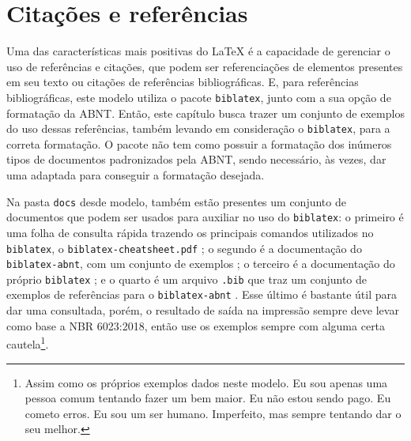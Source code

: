 \chapter{Citações e referências}
Uma das características mais positivas do \LaTeX{} é a capacidade de gerenciar o uso de referências e citações, que podem ser referenciações de elementos presentes em seu texto ou citações de referências bibliográficas. E, para referências bibliográficas\footnotemark, este modelo utiliza o pacote \verb|biblatex|, junto com a sua opção de formatação da ABNT. Então, este capítulo busca trazer um conjunto de exemplos do uso dessas referências, também levando em consideração o \verb|biblatex|, para a correta formatação. O pacote não tem como possuir a formatação dos inúmeros tipos de documentos padronizados pela ABNT, sendo necessário, às vezes, dar uma adaptada para conseguir a formatação desejada.

  Na pasta \texttt{docs} desde modelo, também estão presentes um conjunto de documentos que podem ser usados para auxiliar no uso do \texttt{biblatex}: o primeiro é uma folha de consulta rápida trazendo os principais comandos utilizados no \texttt{biblatex}, o \texttt{biblatex-cheatsheet.pdf} \cite{pdf:biblatex-cheatsheet}; o segundo é a documentação do \texttt{biblatex-abnt}, com um conjunto de exemplos \cite{pdf:biblatex-abnt}; o terceiro é a documentação do próprio \texttt{biblatex} \cite{pdf:biblatex}; e o quarto é um arquivo \texttt{.bib} que traz um conjunto de exemplos de referências para o \texttt{biblatex-abnt} \cite{bib:biblatex-abnt}. Esse último é bastante útil para dar uma consultada, porém, o resultado de saída na impressão sempre deve levar como base a NBR 6023:2018, então use os exemplos sempre com alguma certa cautela\footnote{Assim como os próprios exemplos dados neste modelo. Eu sou apenas uma pessoa comum tentando fazer um bem maior. Eu não estou sendo pago. Eu cometo erros. Eu sou um ser humano. Imperfeito, mas sempre tentando dar o seu melhor.}.

